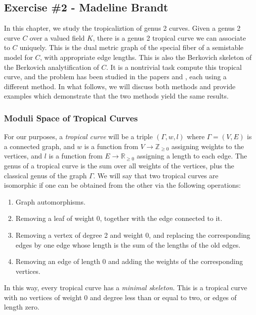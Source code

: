 

\subsection{Exercise \#2 - Madeline Brandt}
 
In this chapter, we study the tropicaliztion of genus 2 curves. Given a genus 2 curve $C$ over a valued field $K$, there is a genus 2 tropical curve we can associate to $C$ uniquely. This is the dual metric graph of the special fiber of a semistable model for $C$, with appropriate edge lengths. This is also the Berkovich skeleton of the Berkovich analytification of $C$.
It is a nontrivial task compute this tropical curve, and the problem has been studied in the papers \cite{masters} and \cite{section5}, each using a different method. In what follows, we will discuss both methods and provide examples which demonstrate that the two methods yield the same results.


\subsubsection{Moduli Space of Tropical Curves}

For our purposes, a \emph{tropical curve} will be a triple $(\Gamma, w, l)$ where $\Gamma = (V,E)$ is a connected graph, and $w$ is a function from $V\rightarrow \mathbb{Z}_{\geq 0}$ assigning weights to the vertices, and $l$ is a function from $E \rightarrow \mathbb{R}_{\geq 0}$ assigning a length to each edge. The genus of a tropical curve is the sum over all weights of the vertices, plus the classical genus of the graph $\Gamma$. We will say that two tropical curves are isomorphic if one can be obtained from the other via the following operations:
\begin{enumerate}
\item Graph automorphisms.
\item Removing a leaf of weight 0, together with the edge connected to it.
\item Removing a vertex of degree 2 and weight 0, and replacing the corresponding edges by one edge whose length is the sum of the lengths of the old edges.
\item Removing an edge of length 0 and adding the weights of the corresponding vertices.
\end{enumerate}
In this way, every tropical curve has a \emph{minimal skeleton}. This is a tropical curve with no vertices of weight 0 and degree less than or equal to two, or edges of length zero.

